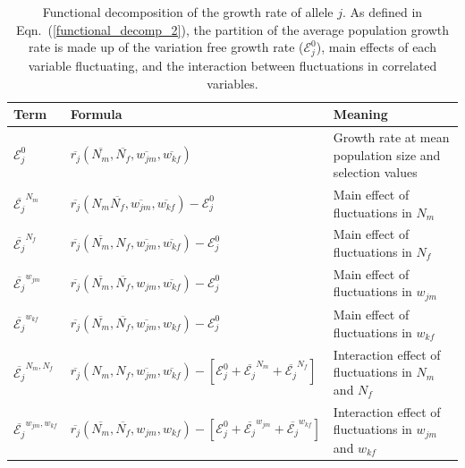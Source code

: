\begin{refsection}
\begin{table}[h]
\fontsize{7}{12}\selectfont %
    \centering
      \caption[Functional decomposition of the growth rate of allele $j$]{Functional decomposition of the growth rate of allele $j$. As defined in Eqn.~(\ref{functional_decomp_2}), the partition of the average population growth rate is made up of the variation free growth rate ($\mathcal{E}^{0}_{j}$), main effects of each variable fluctuating, and the interaction between fluctuations in correlated variables. }
  \resizebox{\textwidth}{!} {\begin{tabular}{l|l|l}
  \toprule
        Term & Formula & Meaning \\
        \hline
         $\mathcal{E}^{0}_{j}$ & $\overline{r_{j}} (\overline{N_{m}}, \overline{N_{f}}, \overline{w_{jm}}, \overline{w_{kf}})$ & Growth rate at mean population size and selection values \\


         $\overline{\mathcal{E}_{j}}^{N_{m}}$ & $\overline{r_{j}}(N_{m} \overline{N_{f}}, \overline{w_{jm}}, \overline{w_{kf}}) - \mathcal{E}^{0}_{j} $ & Main effect of fluctuations in $N_{m}$\\

         $\overline{\mathcal{E}_{j}}^{N_{f}}$ & $ \overline{r_{j}}( \overline{N_{m}}, N_{f},\overline{w_{jm}}, \overline{w_{kf}}) - \mathcal{E}^{0}_{j}$ & Main effect of fluctuations in $N_{f}$ \\

        $\overline{\mathcal{E}_{j}}^{w_{jm}}$ & $ \overline{r_{j}}(\overline{N_{m}}, \overline{N_{f}}, w_{jm}, \overline{w_{kf}}) - \mathcal{E}^{0}_{j}$& Main effect of fluctuations in $w_{jm}$\\

        $\overline{\mathcal{E}_{j}}^{w_{kf}}$ & $ \overline{r_{j}}(\overline{N_{m}}, \overline{N_{f}}, \overline{w_{jm}}, w_{kf})- \mathcal{E}^{0}_{j}$ & Main effect of fluctuations in $w_{kf}$\\

        $\overline{\mathcal{E}_{j}}^{N_{m},N_{f}}$ & $ \overline{r_{j}}(N_{m}, N_{f}, \overline{w_{jm}}, \overline{w_{kf}})- [\mathcal{E}^{0}_{j} +\overline{\mathcal{E}_{j}}^{N_{m}}+\overline{\mathcal{E}_{j}}^{N_{f}}]$ & Interaction effect of fluctuations in $N_{m}$ and $N_{f}$\\

        $\overline{\mathcal{E}_{j}}^{w_{jm},w_{kf}}$ & $ \overline{r_{j}}(\overline{N_{m}}, \overline{N_{f}}, w_{jm}, w_{kf})- [\mathcal{E}^{0}_{j} +\overline{\mathcal{E}_{j}}^{w_{jm}}+\overline{\mathcal{E}_{j}}^{w_{kf}}]$ & Interaction effect of fluctuations in $w_{jm}$ and $w_{kf}$ \\


\end{tabular}}
\end{table}
\end{refsection}
